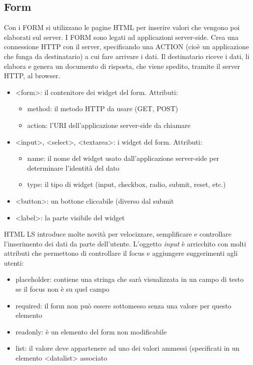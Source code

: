 \documentclass[a4paper,12pt]{article}
\begin{document}
\subsection*{Form}
Con i FORM si utilizzano le pagine HTML per inserire valori che vengono poi elaborati sul server. I FORM sono legati ad applicazioni server-side.  Crea una connessione HTTP con il server, specificando una ACTION (cioè un applicazione che funga da destinatario) a cui fare arrivare i dati. Il destinatario riceve i dati, li elabora e genera un documento di risposta, che viene spedito, tramite il server HTTP, al browser.
\begin{itemize}
  \item <form>: il contenitore dei widget del form. Attributi:
  \begin{itemize}
    \item method: il metodo HTTP da usare (GET, POST)
    \item action: l'URI dell'applicazione server-side da chiamare
  \end{itemize}
  \item <input>, <select>, <textarea>: i widget del form. Attributi:
  \begin{itemize}
    \item name: il nome del widget usato dall'applicazione server-side per determinare l'identità del dato
    \item type: il tipo di widget (input, checkbox, radio, submit, reset, etc.)
  \end{itemize}
  \item <button>: un bottone cliccabile (diverso dal submit
  \item <label>: la parte visibile del widget
\end{itemize}
HTML LS introduce molte novità per velocizzare, semplificare e controllare l’inserimento dei dati da parte dell’utente. L’oggetto \textit{input} è arricchito con molti attributi che permettono di controllare il focus e aggiungere suggerimenti agli utenti:
\begin{itemize}
  \item placeholder: contiene una stringa che sarà visualizzata in un campo di testo se il focus non è su quel campo
  \item required: il form non può essere sottomesso senza una valore per questo elemento
  \item readonly: è un elemento del form non modificabile
  \item list: il valore deve appartenere ad uno dei valori ammessi (specificati in un elemento <datalist> associato
\end{itemize}
\end{document}
